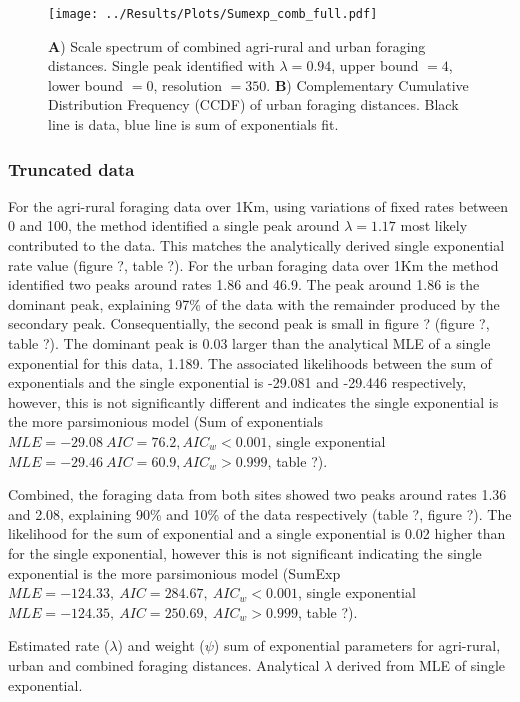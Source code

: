 \documentclass[11pt,usenames,dvipsnames]{article}
\begin{document}
\begin{figure}[H]
	\centering
	\texttt{[image: ../Results/Plots/Sumexp\_comb\_full.pdf]}
	\caption{\textbf{A}) Scale spectrum of combined agri-rural and urban foraging distances. Single peak identified with $\lambda = 0.94$, upper bound $= 4$, lower bound $= 0$, resolution $= 350$. \textbf{B}) Complementary Cumulative Distribution Frequency (CCDF) of urban foraging distances. Black line is data, blue line is sum of exponentials fit.}
\end{figure}


\subsubsection{Truncated data}

For the agri-rural foraging data over 1Km, using variations of fixed rates between 0 and 100, the method identified a single peak around $\lambda = 1.17$ most likely contributed to the data. This matches the analytically derived single exponential rate value (figure ?, table ?). For the urban foraging data over 1Km the method identified two peaks around rates 1.86 and 46.9. The peak around 1.86 is the dominant peak, explaining 97\% of the data with the remainder produced by the secondary peak. Consequentially, the second peak is small in figure ? (figure ?, table ?). The dominant peak is 0.03 larger than the analytical MLE of a single exponential for this data, 1.189. The associated likelihoods between the sum of exponentials and the single exponential is -29.081 and -29.446 respectively, however, this is not significantly different and indicates the single exponential is the more parsimonious model (Sum of exponentials $MLE = -29.08\ AIC = 76.2, AIC_w < 0.001$, single exponential $MLE = -29.46\ AIC = 60.9, AIC_w > 0.999$, table ?). 

Combined, the foraging data from both sites showed two peaks around rates 1.36 and 2.08, explaining 90\% and 10\% of the data respectively (table ?, figure ?). The likelihood for the sum of exponential and a single exponential is 0.02 higher than for the single exponential, however this is not significant indicating the single exponential is the more parsimonious model (SumExp $MLE = -124.33,\ AIC = 284.67,\ AIC_w < 0.001$, single exponential $MLE = -124.35,\ AIC = 250.69,\ AIC_w > 0.999$, table ?).

\begin{table}[H]
	\centering
	\caption{Estimated rate ($\lambda$) and weight ($\psi$) sum of exponential parameters for agri-rural, urban and combined foraging distances. Analytical $\lambda$ derived from MLE of single exponential.}
	
\end{table}
\end{document}
